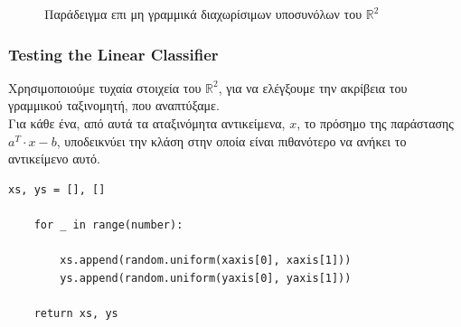 \documentclass[12pt]{article}
\newcommand{\R}{\mathbb{R}}
\begin{document}
\begin{figure}[hp]
    \centering
    \qquad
    \caption{Παράδειγμα επι μη γραμμικά διαχωρίσιμων υποσυνόλων του \( \R^2 \)}
\end{figure}

\subsubsection{Testing the Linear Classifier}

Χρησιμοποιούμε τυχαία στοιχεία του \( \R^2 \),
για να ελέγξουμε την ακρίβεια του γραμμικού ταξινομητή, που αναπτύξαμε. \\

Για κάθε ένα, από αυτά τα αταξινόμητα αντικείμενα, \( x \),
το πρόσημο της παράστασης \( a^{T} \cdot x - b \),
υποδεικνύει την κλάση στην οποία είναι πιθανότερο να ανήκει το αντικείμενο αυτό. \\

\begin{lstlisting}[caption={Η μέθοδος \textit{generate\_random\_points}}]
    xs, ys = [], []

    for _ in range(number):

        xs.append(random.uniform(xaxis[0], xaxis[1]))
        ys.append(random.uniform(yaxis[0], yaxis[1]))

    return xs, ys
\end{lstlisting}
\end{document}
